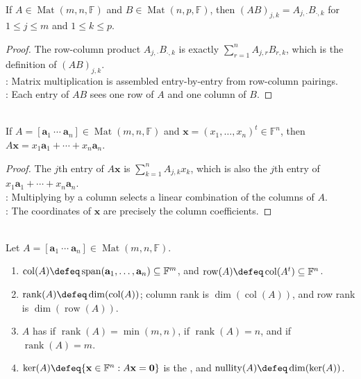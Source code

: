 \begin{proposition} \label{prop:matrix-product-entry-row-column} \\
If $A\in\operatorname{Mat}(m,n,\mathbb{F})$ and $B\in\operatorname{Mat}(n,p,\mathbb{F})$, then $(AB)_{j,k}=A_{j,\cdot}B_{\cdot,k}$ for $1\leq j\leq m$ and $1\leq k\leq p$.
\begin{proof}
The row-column product $A_{j,\cdot}B_{\cdot,k}$ is exactly $\sum_{r=1}^n A_{j,r}B_{r,k}$, which is the definition of $(AB)_{j,k}$.\\
: Matrix multiplication is assembled entry-by-entry from row-column pairings.\\
: Each entry of $AB$ sees one row of $A$ and one column of $B$.
\end{proof}
\end{proposition}

\begin{proposition} \label{prop:matrix-vector-product-column-combination} \\
If $A=[\mathbf{a}_1\ \cdots\ \mathbf{a}_n]\in\operatorname{Mat}(m,n,\mathbb{F})$ and $\mathbf{x}=(x_1,\ldots,x_n)^t\in\mathbb{F}^n$, then $A\mathbf{x}=x_1\mathbf{a}_1+\cdots+x_n\mathbf{a}_n$.
\begin{proof}
The $j$th entry of $A\mathbf{x}$ is $\sum_{k=1}^n A_{j,k}x_k$, which is also the $j$th entry of $x_1\mathbf{a}_1+\cdots+x_n\mathbf{a}_n$.\\
: Multiplying by a column selects a linear combination of the columns of $A$.\\
: The coordinates of $\mathbf{x}$ are precisely the column coefficients.
\end{proof}
\end{proposition}

\begin{definition} \label{def:column-space-matrix-rank-nullity} \\
Let $A=[\mathbf{a}_1\ \cdots\ \mathbf{a}_n]\in\operatorname{Mat}(m,n,\mathbb{F})$.
\begin{enumerate}[label=(\roman*)]
\setlength{\itemsep}{0pt}
\item $\operatorname{col}(A)\defeq\operatorname{span}(\mathbf{a}_1,\ldots,\mathbf{a}_n)\subseteq\mathbb{F}^m$, and $\operatorname{row}(A)\defeq\operatorname{col}(A^t)\subseteq\mathbb{F}^n$.
\item $\operatorname{rank}(A)\defeq\dim(\operatorname{col}(A))$; column rank is $\dim(\operatorname{col}(A))$, and row rank is $\dim(\operatorname{row}(A))$.
\item $A$ has  if $\operatorname{rank}(A)=\min(m,n)$,  if $\operatorname{rank}(A)=n$, and  if $\operatorname{rank}(A)=m$.
\item $\ker(A)\defeq\{\mathbf{x}\in\mathbb{F}^n:A\mathbf{x}=\mathbf{0}\}$ is the , and $\operatorname{nullity}(A)\defeq\dim(\ker(A))$.
\end{enumerate}
\end{definition}

